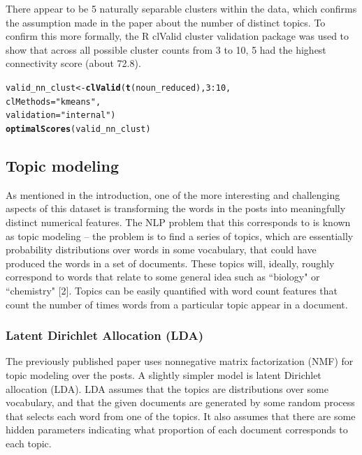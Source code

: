 \documentclass{article}\usepackage[]{graphicx}\usepackage[]{color}
\makeatletter
\newcommand{\hlnum}[1]{\textcolor[rgb]{0.686,0.059,0.569}{#1}}%
\newcommand{\hlstr}[1]{\textcolor[rgb]{0.192,0.494,0.8}{#1}}%
\newcommand{\hlopt}[1]{\textcolor[rgb]{0,0,0}{#1}}%
\newcommand{\hlstd}[1]{\textcolor[rgb]{0.345,0.345,0.345}{#1}}%
\newcommand{\hlkwb}[1]{\textcolor[rgb]{0.69,0.353,0.396}{#1}}%
\newcommand{\hlkwc}[1]{\textcolor[rgb]{0.333,0.667,0.333}{#1}}%
\newcommand{\hlkwd}[1]{\textcolor[rgb]{0.737,0.353,0.396}{\textbf{#1}}}%
\newenvironment{kframe}{%
 \def\at@end@of@kframe{}%
 \ifinner\ifhmode%
  \def\at@end@of@kframe{\end{minipage}}%
  \begin{minipage}{\columnwidth}%
 \fi\fi%
 \def\FrameCommand##1{\hskip\@totalleftmargin \hskip-\fboxsep
 \colorbox{shadecolor}{##1}\hskip-\fboxsep
     \hskip-\linewidth \hskip-\@totalleftmargin \hskip\columnwidth}%
 \MakeFramed {\advance\hsize-\width
   \@totalleftmargin\z@ \linewidth\hsize
   \@setminipage}}%
 {\par\unskip\endMakeFramed%
 \at@end@of@kframe}
\newenvironment{knitrout}{}{} %
\makeatother
\begin{document}
There appear to be 5 naturally separable clusters within the data, which confirms the assumption made in the paper about the number of distinct topics. To confirm this more formally, the R clValid cluster validation package was used to show that across all possible cluster counts from 3 to 10, 5 had the highest connectivity score (about 72.8).

\begin{knitrout}
\color{fgcolor}\begin{kframe}
\begin{alltt}
\hlstd{valid_nn_clust}\hlkwb{<-} \hlkwd{clValid}\hlstd{(}\hlkwd{t}\hlstd{(noun_reduced),} \hlnum{3}\hlopt{:}\hlnum{10}\hlstd{,}
                         \hlkwc{clMethods} \hlstd{=} \hlstr{"kmeans"}\hlstd{,}
                         \hlkwc{validation}\hlstd{=}\hlstr{"internal"}\hlstd{)}
\hlkwd{optimalScores}\hlstd{(valid_nn_clust)}
\end{alltt}
\end{kframe}
\end{knitrout}


\subsection{Topic modeling}

As mentioned in the introduction, one of the more interesting and challenging aspects of this dataset is transforming the words in the posts into meaningfully distinct numerical features. The NLP problem that this corresponds to is known as topic modeling -- the problem is to find a series of topics, which are essentially probability distributions over words in some vocabulary, that could have produced the words in a set of documents. These topics will, ideally, roughly correspond to words that relate to some general idea such as ``biology" or ``chemistry" [2]. Topics can be easily quantified with word count features that count the number of times words from a particular topic appear in a document.

\subsubsection{Latent Dirichlet Allocation (LDA)}

The previously published paper uses nonnegative matrix factorization (NMF) for topic modeling over the posts. A slightly simpler model is latent Dirichlet allocation (LDA). LDA assumes that the topics are distributions over some vocabulary, and that the given documents are generated by some random process that selects each word from one of the topics. It also assumes that there are some hidden parameters indicating what proportion of each document corresponds to each topic.
\end{document}

